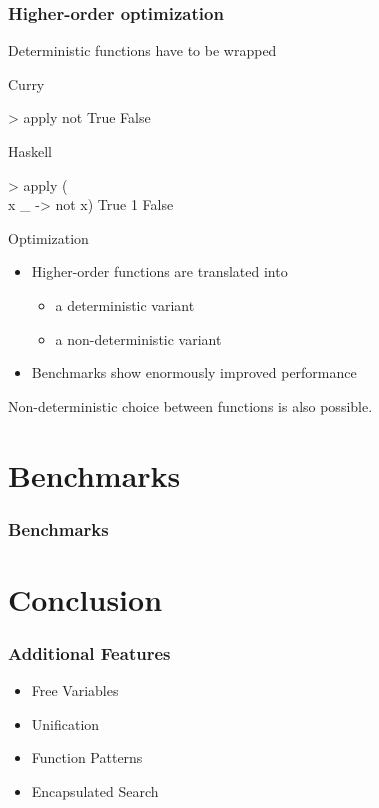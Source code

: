 \documentclass[utf8,handout]{beamer}
\begin{document}
\begin{frame}[fragile]
\frametitle{Higher-order optimization}
Deterministic functions have to be wrapped
\begin{block}{Curry}
\begin{semiverbatim}
> apply not True
False
\end{semiverbatim}
\end{block}
\begin{block}{Haskell}
\begin{semiverbatim}
> apply (\\x _ -> not x) True 1
False
\end{semiverbatim}
\end{block}
\begin{block}{Optimization}
\begin{itemize}
\item Higher-order functions are translated into
  \begin{itemize}
   \item a deterministic variant
   \item a non-deterministic variant
  \end{itemize}
\item Benchmarks show enormously improved performance
\end{itemize}
\end{block}
Non-deterministic choice between functions is also possible.
\end{frame}





\section{Benchmarks}

\begin{frame}
\frametitle{Benchmarks}
\end{frame}




\section{Conclusion}

\begin{frame}
\frametitle{Additional Features}
\begin{itemize}

\item Free Variables
\item Unification
\item Function Patterns
\item Encapsulated Search

\end{itemize}
\end{frame}
\end{document}
